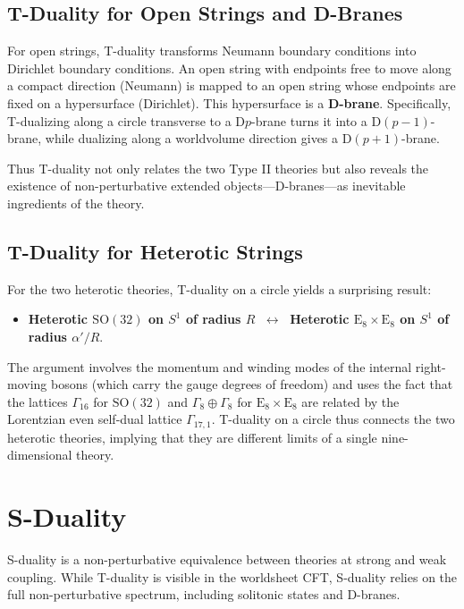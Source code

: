 \documentclass[11pt]{article}
\begin{document}
\subsection{T-Duality for Open Strings and D-Branes}
For open strings, T-duality transforms Neumann boundary conditions into Dirichlet boundary conditions. An open string with endpoints free to move along a compact direction (Neumann) is mapped to an open string whose endpoints are fixed on a hypersurface (Dirichlet). This hypersurface is a \textbf{D-brane}. Specifically, T-dualizing along a circle transverse to a D$p$-brane turns it into a D$(p-1)$-brane, while dualizing along a worldvolume direction gives a D$(p+1)$-brane.

Thus T-duality not only relates the two Type II theories but also reveals the existence of non-perturbative extended objects---D-branes---as inevitable ingredients of the theory.

\subsection{T-Duality for Heterotic Strings}
For the two heterotic theories, T-duality on a circle yields a surprising result:
\begin{itemize}
    \item \textbf{Heterotic $\mathrm{SO}(32)$ on $S^1$ of radius $R$} $\;\leftrightarrow\;$ \textbf{Heterotic $\mathrm{E}_8\times\mathrm{E}_8$ on $S^1$ of radius $\alpha'/R$}.
\end{itemize}
The argument involves the momentum and winding modes of the internal right-moving bosons (which carry the gauge degrees of freedom) and uses the fact that the lattices $\Gamma_{16}$ for $\mathrm{SO}(32)$ and $\Gamma_8\oplus\Gamma_8$ for $\mathrm{E}_8\times\mathrm{E}_8$ are related by the Lorentzian even self-dual lattice $\Gamma_{17,1}$. T-duality on a circle thus connects the two heterotic theories, implying that they are different limits of a single nine-dimensional theory.

\section{S-Duality}
S-duality is a non-perturbative equivalence between theories at strong and weak coupling. While T-duality is visible in the worldsheet CFT, S-duality relies on the full non-perturbative spectrum, including solitonic states and D-branes.
\end{document}
